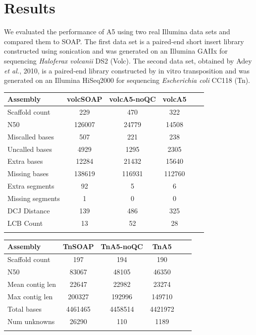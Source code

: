 \documentclass{bioinfo}
\begin{document}
\section{Results}

We evaluated the performance of A5 using two real Illumina data sets and compared them to
SOAP. The first data set is a paired-end short insert library constructed using sonication 
and was generated on an Illumina GAIIx for sequencing \emph{Haloferax volcanii} DS2 (Volc). 
The second data set, obtained by Adey \emph{et al.}, 2010, is a paired-end library constructed 
by in vitro transposition and was generated on an Illumina HiSeq2000 for sequencing \emph{Escherichia coli} CC118 (Tn). 

\begin{table}[!t]
{\begin{tabular}{l|ccccc}\toprule
Assembly            & volcSOAP & volcA5-noQC & volcA5  \\\midrule
Scaffold count      & 229      & 470         & 322     \\
N50                 & 126007   & 24779       & 14508   \\
Miscalled bases     & 507      & 221         & 238     \\
Uncalled bases      & 4929     & 1295        & 2305    \\
Extra bases         & 12284    & 21432       & 15640   \\
Missing bases       & 138619   & 116931      & 112760  \\
Extra segments      & 92       & 5           & 6       \\
Missing segments    & 1        & 0           & 0       \\
DCJ Distance        & 139      & 486         & 325     \\
LCB Count           & 13       & 52          & 28      \\
\botrule \\
\end{tabular}}{}
\end{table}


\begin{table}[!t]
{\begin{tabular}{l|ccccc}\toprule
Assembly            & TnSOAP & TnA5-noQC & TnA5    \\\midrule
Scaffold count      & 197     & 194     & 190     \\
N50                 & 83067   & 48105   & 46350   \\
Mean contig len     & 22647   & 22982   & 23274   \\
Max contig len      & 200327  & 192996  & 149710  \\
Total bases         & 4461465 & 4458514 & 4421972 \\
Num unknowns        & 26290   & 110     & 1189    \\
\botrule \\
\end{tabular}}{}
\end{table}
\end{document}
